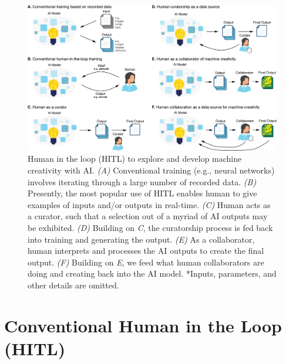 \documentclass[letterpaper]{article} %
\begin{document}
\begin{figure}[tbh!]
\begin{center}
\includegraphics[width=1\textwidth]{hitl_creativity2.png}
\end{center} 
\caption{Human in the loop (HITL) to explore and develop machine creativity with AI. \emph{(A)} Conventional training (e.g., neural networks) involves iterating through a large number of recorded data. \emph{(B)} Presently, the most popular use of HITL enables human to give examples of inputs and/or outputs in real-time. \emph{(C)} Human acts as a curator, such that a selection out of a myriad of AI outputs may be exhibited. \emph{(D)} Building on \emph{C}, the curatorship process is fed back into training and generating the output. \emph{(E)} As a collaborator, human interprets and processes the AI outputs to create the final output. \emph{(F)} Building on \emph{E}, we feed what human collaborators are doing and creating back into the AI model. *Inputs, parameters, and other details are omitted.}
\label{hitl}
\end{figure}

\section{Conventional Human in the Loop (HITL)}
\end{document}
